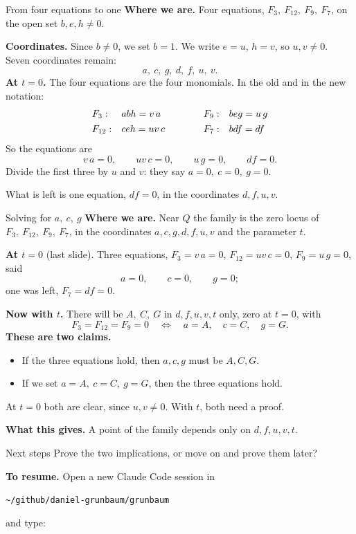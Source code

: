 \begin{frame}{From four equations to one}
\textbf{Where we are.} Four equations, \(F_3,\ F_{12},\ F_9,\ F_7\), on the open set \(b,e,h\ne0\).
\par\smallskip
\textbf{Coordinates.} Since \(b\ne0\), we set \(b=1\). We write \(e=u\), \(h=v\), so \(u,v\ne0\). Seven coordinates remain:
\[
a,\ c,\ g,\ d,\ f,\ u,\ v.
\]
\textbf{At \(t=0\).} The four equations are the four monomials. In the old and in the new notation:
\[
\begin{array}{l@{\quad}l@{\qquad\qquad}l@{\quad}l}
F_3:& abh=v\,a & F_9:& beg=u\,g\\[4pt]
F_{12}:& ceh=uv\,c & F_7:& bdf=df
\end{array}
\]
So the equations are
\[
v\,a=0,\qquad uv\,c=0,\qquad u\,g=0,\qquad df=0.
\]
Divide the first three by \(u\) and \(v\): they say \(a=0,\ c=0,\ g=0\).
\par\medskip
What is left is one equation, \(df=0\), in the coordinates \(d,f,u,v\).
\end{frame}

\begin{frame}{Solving for \(a,\ c,\ g\)}
\textbf{Where we are.} Near \(Q\) the family is the zero locus of \(F_3,\ F_{12},\ F_9,\ F_7\), in the coordinates \(a,c,g,d,f,u,v\) and the parameter \(t\).
\par
\textbf{At \(t=0\)} (last slide). Three equations, \(F_3=v\,a=0\), \(F_{12}=uv\,c=0\), \(F_9=u\,g=0\), said
\[
a=0,\qquad c=0,\qquad g=0;
\]
one was left, \(F_7=df=0\).
\par
\textbf{Now with \(t\).} There will be \(A,\ C,\ G\) in \(d,f,u,v,t\) only, zero at \(t=0\), with
\[
\boxed{F_3=F_{12}=F_9=0\quad\Longleftrightarrow\quad a=A,\quad c=C,\quad g=G.}
\]
\textbf{These are two claims.}
\begin{itemize}
\setlength{\itemsep}{0pt}
\item[\(\Rightarrow\)] If the three equations hold, then \(a,c,g\) must be \(A,C,G\).
\item[\(\Leftarrow\)] If we set \(a=A,\ c=C,\ g=G\), then the three equations hold.
\end{itemize}
At \(t=0\) both are clear, since \(u,v\ne0\). With \(t\), both need a proof.
\par
\textbf{What this gives.} A point of the family depends only on \(d,f,u,v,t\).
\end{frame}

\begin{frame}{Next steps}
\centering
{\Large Prove the two implications, or move on and prove them later?}
\par\vspace{1.2cm}
\textbf{To resume.} Open a new Claude Code session in
\par\smallskip
\texttt{\textasciitilde/github/daniel-grunbaum/grunbaum}
\par\medskip
and type:
\par\smallskip
{}
\end{frame}

